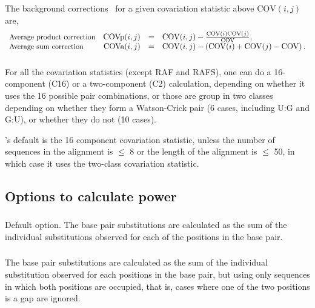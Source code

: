 The background corrections~\citep{DunnGloor07} for a given
covariation statistic above $\mathrm{COV}(i,j)$ are,
%
\[
\begin{array}{lrcl}
  \mbox{\small Average product correction} & \mathrm{COVp}(i,j) & = &  \mathrm{COV}(i,j) - \frac { \mathrm{COV}(i) \mathrm{COV}(j) } { \mathrm{COV} }, \\
  \mbox{\small Average sum correction}     & \mathrm{COVa}(i,j) & = &  \mathrm{COV}(i,j) - \left( \mathrm{COV}(i) + \mathrm{COV}(j) - \mathrm{COV} \right). \\
\end{array}
\]



\subsubsection{}
For all the covariation statistics (except RAF and RAFS), one can do a
16-component (C16) or a two-component (C2) calculation, depending on
whether it uses the 16 possible pair combinations, or those are group
in two classes depending on whether they form a Watson-Crick pair (6
cases, including U:G and G:U), or whether they do not (10 cases).

\rscape's default is the 16 component covariation statistic, unless
the number of sequences in the alignment is $\leq$ 8 or the length of
the alignment is $\leq$ 50, in which case it uses the two-class
covariation statistic.

\subsection{Options to calculate power}

\subsubsection{} Default option. The base pair substitutions are calculated as the sum of the individual substitutions observed for each of the positions in the base pair.

\subsubsection{} The base pair substitutions are calculated as the sum of the individual substitution observed for each positions in the base pair, but using only sequences in which both positions are occupied, that is, cases where one of the two positions is a gap are ignored.


